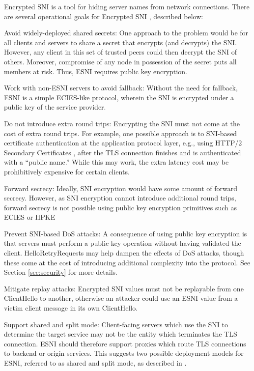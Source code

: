 \documentclass{article}
\theoremstyle{definition}
\theoremstyle{definition}
\begin{document}
Encrypted SNI is a tool for hiding server names from network connections. There are several operational goals 
for Encrypted SNI \cite{requirements}, described below:
%
\begin{compactitem}
  \item Avoid widely-deployed shared secrets: One approach to the problem would be for all
  clients and servers to share a secret that encrypts (and decrypts) the SNI. However, any 
  client in this set of trusted peers could then decrypt the SNI of others. Moreover, compromise
  of any node in possession of the secret puts all members at risk. Thus, ESNI requires 
  public key encryption.
  \item Work with non-ESNI servers to avoid fallback: Without the need for fallback, ESNI 
  is a simple ECIES-like protocol, wherein the SNI is encrypted under a public key of the 
  service provider.
  \item Do not introduce extra round trips: Encrypting the SNI must not come at the cost of 
  extra round trips. For example, one possible approach is to SNI-based certificate authentication
  at the application protocol layer, e.g., using HTTP/2 Secondary Certificates \cite{ietf-httpbis-http2-secondary-certs-04}, after
  the TLS connection finishes and is authenticated with a ``public name.'' While this may work,
  the extra latency cost may be prohibitively expensive for certain clients.
  \item Forward secrecy: Ideally, SNI encryption would have some amount of forward secrecy.
  However, as SNI encryption cannot introduce additional round trips, forward secrecy is not
  possible using public key encryption primitives such as ECIES \cite{shoup2001proposal} or HPKE \cite{irtf-cfrg-hpke-00}
  \item Prevent SNI-based DoS attacks: A consequence of using public key encryption is that
  servers must perform a public key operation without having validated the client. HelloRetryRequests
  may help dampen the effects of DoS attacks, though these come at the cost of introducing
  additional complexity into the protocol. See Section \ref{sec:security} for more details.
  \item Mitigate replay attacks: Encrypted SNI values must not be replayable from one 
  ClientHello to another, otherwise an attacker could use an ESNI value from a victim client
  message in its own ClientHello.
  \item Support shared and split mode: Client-facing servers which use the SNI to determine 
  the target service may not be the entity which terminates the TLS connection. ESNI should therefore
  support proxies which route TLS connections to backend or origin services. This suggests two
  possible deployment models for ESNI, referred to as shared and split mode, as described in
  \cite{ietf-tls-esni-04}.
\end{compactitem}
%
\end{document}
